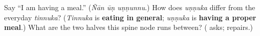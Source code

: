 \begin{tcolorbox}[breakable,colback=teal!4,colframe=teal!35!black,title={Before you move on}]
Say \textquotedblleft{}I am having a meal.\textquotedblright{} (\emph{Ñān ūṇ uṇṇunnu}.) How does \emph{uṇṇuka} differ from the everyday \emph{tinnuka}? (\emph{Tinnuka} is \textbf{eating in general}; \emph{uṇṇuka} is \textbf{having a proper meal}.) What are the two halves this spine node runs between? (\textbf{} asks; \textbf{} repairs.)
\end{tcolorbox}
